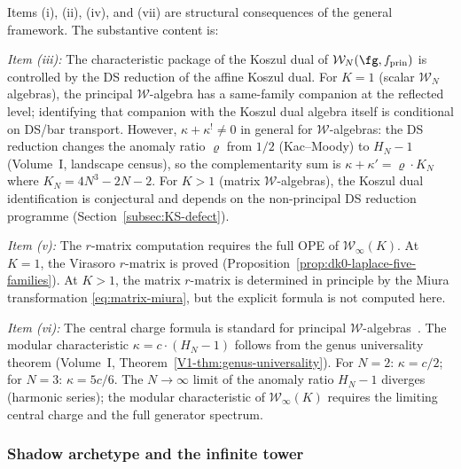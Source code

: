\begin{remark}
\label{rem:M5-package-scope}
Items (i), (ii), (iv), and (vii) are structural
consequences of the general framework. The substantive content is:

\emph{Item (iii):} The characteristic package of the Koszul dual of
$\mathcal{W}_N(\fg, f_{\mathrm{prin}})$ is controlled by the DS
reduction of the affine Koszul dual. For $K = 1$ (scalar
$\mathcal{W}_N$ algebras), the principal $\mathcal{W}$-algebra has
a same-family companion at the reflected level; identifying that
companion with the Koszul dual algebra itself is conditional on
DS/bar transport. However, $\kappa + \kappa^! \ne 0$ in general for
$\mathcal{W}$-algebras: the DS reduction changes the anomaly ratio
$\varrho$ from $1/2$ (Kac--Moody) to $H_N - 1$
(Volume~I, landscape census), so the complementarity sum is
$\kappa + \kappa' = \varrho \cdot K_N$ where $K_N = 4N^3 - 2N - 2$.
For $K > 1$ (matrix $\mathcal{W}$-algebras),
the Koszul dual identification is conjectural and depends on the
non-principal DS reduction programme
(Section~\ref{subsec:KS-defect}).

\emph{Item (v):} The $r$-matrix computation requires the
full OPE of $\mathcal{W}_\infty(K)$. At $K = 1$, the
Virasoro $r$-matrix is proved
(Proposition~\ref{prop:dk0-laplace-five-families}).
At $K > 1$, the matrix $r$-matrix is determined in
principle by the Miura transformation
\eqref{eq:matrix-miura}, but the explicit formula is not
computed here.

\emph{Item (vi):} The central charge formula is standard for principal
$\mathcal{W}$-algebras~\cite{FL88}. The modular characteristic
$\kappa = c \cdot (H_N - 1)$ follows from the genus universality theorem
\textup{(}Volume~I, Theorem~\textup{\ref*{V1-thm:genus-universality}}\textup{)}.
For $N = 2$: $\kappa = c/2$; for $N = 3$: $\kappa = 5c/6$.
The $N \to \infty$ limit of the anomaly ratio $H_N - 1$ diverges
\textup{(}harmonic series\textup{)}; the modular characteristic of
$\mathcal{W}_\infty(K)$ requires the limiting central charge and the
full generator spectrum.
\end{remark}

\subsubsection{Shadow archetype and the infinite tower}

